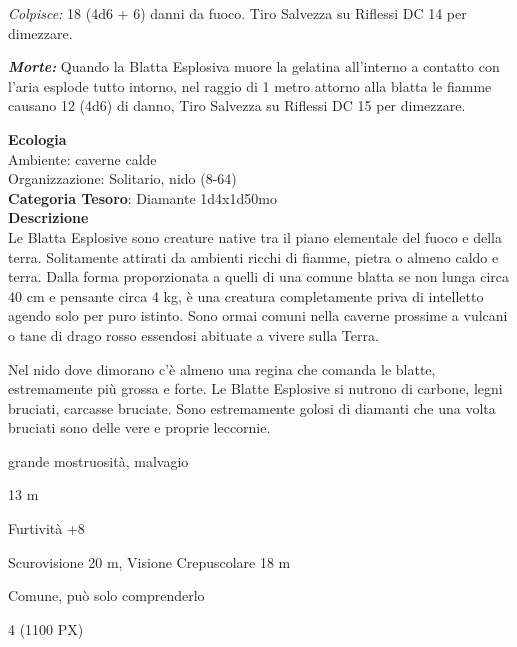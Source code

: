 \begin{multicols}{2}
{\emph{Colpisce:} 18 (4d6 + 6) danni da fuoco. Tiro Salvezza su Riflessi DC 14 per dimezzare.

\emph{\textbf{Morte:}} Quando la Blatta Esplosiva muore la gelatina all'interno a contatto con l'aria esplode tutto intorno, nel raggio di 1 metro attorno alla blatta le fiamme causano 12 (4d6) di danno, Tiro Salvezza su Riflessi DC 15 per dimezzare.

\textbf{Ecologia}\\
Ambiente: caverne calde\\
Organizzazione: Solitario, nido (8-64)\\
\textbf{Categoria Tesoro}: Diamante 1d4x1d50mo\\
\textbf{Descrizione}\\
Le Blatta Esplosive sono creature native tra il piano elementale del fuoco e della terra. Solitamente attirati da ambienti ricchi di fiamme, pietra o almeno caldo e terra.
Dalla forma proporzionata a quelli di una comune blatta se non lunga circa 40 cm e pensante circa 4 kg, è una creatura completamente priva di intelletto agendo solo per puro istinto.
Sono ormai comuni nella caverne prossime a vulcani o tane di drago rosso essendosi abituate a vivere sulla Terra.

Nel nido dove dimorano c'è almeno una regina che comanda le blatte, estremamente più grossa e forte. Le Blatte Esplosive si nutrono di carbone, legni bruciati, carcasse bruciate. Sono estremamente golosi di diamanti che una volta bruciati sono delle vere e proprie leccornie.

\begin{description}[noitemsep, topsep=0pt, parsep=0pt, partopsep=0pt, itemsep=1pt, leftmargin=2.35cm,  labelwidth=2.2cm, itemindent=0cm, listparindent=0pt] %
\setlength{\baselineskip}{10pt}
\item[\textbf{Taglia/Tipo}] grande mostruosità, malvagio
\item[\textbf{Caratt.}] 
\item[\textbf{Punti Ferita}] 
\item[\textbf{Movimento}] 13 m
\item[\textbf{Tiri Salvez.}] 
\item[\textbf{Comp.}] Furtività +8
\item[\textbf{Sensi}] Scurovisione 20 m, Visione Crepuscolare 18 m
\item[\textbf{Linguaggi}] Comune, può solo comprenderlo
\item[\textbf{Sfida}] 4 (1100 PX)
\end{description}
\smallskip

}
\end{multicols}
